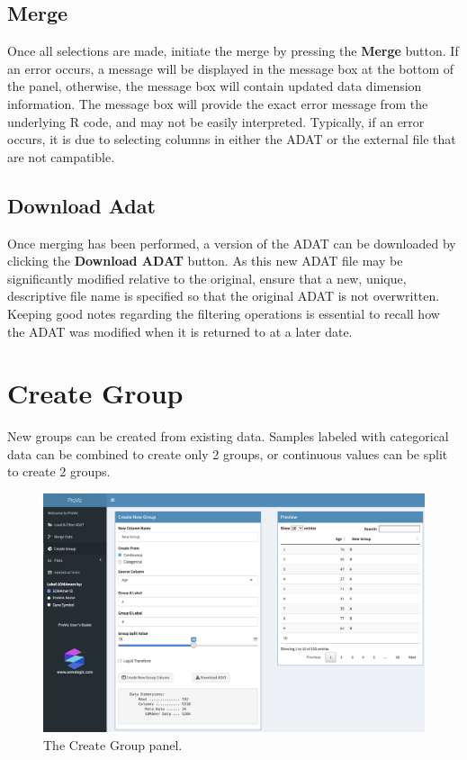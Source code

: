 \documentclass[
]{book}
\begin{document}
\hypertarget{merge}{%
\section{Merge}\label{merge}}

Once all selections are made, initiate the merge by pressing the \textbf{Merge} button. If an error occurs, a message will be displayed in the message box at the bottom of the panel, otherwise, the message box will contain updated data dimension information. The message box will provide the exact error message from the underlying R code, and may not be easily interpreted. Typically, if an error occurs, it is due to selecting columns in either the ADAT or the external file that are not campatible.

\hypertarget{download-adat-1}{%
\section{Download Adat}\label{download-adat-1}}

Once merging has been performed, a version of the ADAT can be downloaded by clicking the \textbf{Download ADAT} button. As this new ADAT file may be significantly modified relative to the original, ensure that a new, unique, descriptive file name is specified so that the original ADAT is not overwritten. Keeping good notes regarding the filtering operations is essential to recall how the ADAT was modified when it is returned to at a later date.

\hypertarget{create-group}{%
\chapter{Create Group}\label{create-group}}

New groups can be created from existing data. Samples labeled with categorical data can be combined to create only 2 groups, or continuous values can be split to create 2 groups.

\begin{figure}
\centering
\includegraphics{images/CreateGroup.png}
\caption{The Create Group panel.}
\end{figure}
\end{document}
